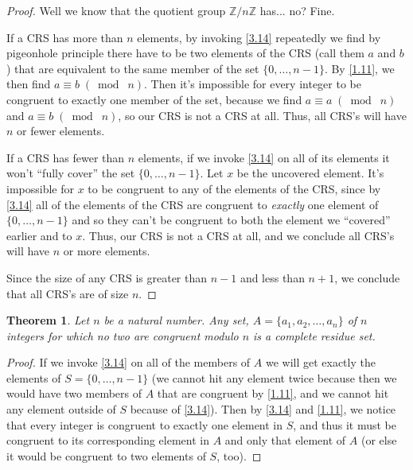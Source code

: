 \documentclass{article}
\newtheorem{thm}{Theorem}[section]
\numberwithin{equation}{thm}
\providecommand{\gmod}[1]{\; (\bmod \; #1)}
\begin{document}
\begin{proof}
  Well we know that the quotient group $\mathbb{Z} / n\mathbb{Z}$ has... no? Fine.

  If a CRS has more than $n$ elements, by invoking \ref{3.14} repeatedly we find by pigeonhole principle there have to be two elements of the CRS (call them $a$ and $b$) that are equivalent to the same member of the set $\{0, \ldots, n-1\}$. By \ref{1.11}, we then find $a \equiv b \gmod n$. Then it's impossible for every integer to be congruent to exactly one member of the set, because we find $a \equiv a \gmod n$ and $a \equiv b \gmod n$, so our CRS is not a CRS at all. Thus, all CRS's will have $n$ or fewer elements.

  If a CRS has fewer than $n$ elements, if we invoke \ref{3.14} on all of its elements it won't ``fully cover'' the set $\{0, \ldots, n-1\}$. Let $x$ be the uncovered element. It's impossible for $x$ to be congruent to any of the elements of the CRS, since by \ref{3.14} all of the elements of the CRS are congruent to \emph{exactly} one element of $\{0, \ldots, n-1\}$ and so they can't be congruent to both the element we ``covered'' earlier and to $x$. Thus, our CRS is not a CRS at all, and we conclude all CRS's will have $n$ or more elements.

  Since the size of any CRS is greater than $n-1$ and less than $n+1$, we conclude that all CRS's are of size $n$.
\end{proof}



\begin{thm} \label{3.17}
  Let $n$ be a natural number. Any set, $A = \{a_1, a_2, \ldots, a_n\}$ of $n$ integers for which no two are congruent modulo $n$ is a complete residue set.
\end{thm}

\begin{proof}
  If we invoke \ref{3.14} on all of the members of $A$ we will get exactly the elements of $S = \{0, \ldots, n-1\}$ (we cannot hit any element twice because then we would have two members of $A$ that are congruent by \ref{1.11}, and we cannot hit any element outside of $S$ because of \ref{3.14}). Then by \ref{3.14} and \ref{1.11}, we notice that every integer is congruent to exactly one element in $S$, and thus it must be congruent to its corresponding element in $A$ and only that element of $A$ (or else it would be congruent to two elements of $S$, too).
\end{proof}
\end{document}
